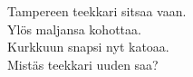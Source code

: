 
            Tampereen teekkari sitsaa vaan. \\
            Ylös maljansa kohottaa. \\
            Kurkkuun snapsi nyt katoaa. \\
            Mistäs teekkari uuden saa? \\

